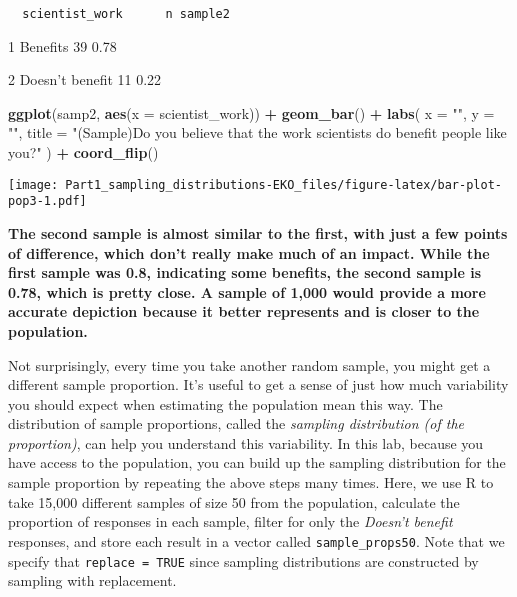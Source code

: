 \documentclass[
]{article}
\newenvironment{Shaded}{\begin{snugshade}}{\end{snugshade}}
\newcommand{\AttributeTok}[1]{\textcolor[rgb]{0.13,0.29,0.53}{#1}}
\newcommand{\FunctionTok}[1]{\textcolor[rgb]{0.13,0.29,0.53}{\textbf{#1}}}
\newcommand{\NormalTok}[1]{#1}
\newcommand{\SpecialCharTok}[1]{\textcolor[rgb]{0.81,0.36,0.00}{\textbf{#1}}}
\newcommand{\StringTok}[1]{\textcolor[rgb]{0.31,0.60,0.02}{#1}}
\begin{document}
\begin{verbatim}
  scientist_work      n sample2
\end{verbatim}

1 Benefits 39 0.78

2 Doesn't benefit 11 0.22

\begin{Shaded}
\begin{Highlighting}[]
\FunctionTok{ggplot}\NormalTok{(samp2, }\FunctionTok{aes}\NormalTok{(}\AttributeTok{x =}\NormalTok{ scientist\_work)) }\SpecialCharTok{+}
  \FunctionTok{geom\_bar}\NormalTok{() }\SpecialCharTok{+}
  \FunctionTok{labs}\NormalTok{(}
    \AttributeTok{x =} \StringTok{""}\NormalTok{, }\AttributeTok{y =} \StringTok{""}\NormalTok{,}
    \AttributeTok{title =} \StringTok{"(Sample)Do you believe that the work scientists do benefit people like you?"}
\NormalTok{  ) }\SpecialCharTok{+}
  \FunctionTok{coord\_flip}\NormalTok{() }
\end{Highlighting}
\end{Shaded}

\texttt{[image: Part1\_sampling\_distributions-EKO\_files/figure-latex/bar-plot-pop3-1.pdf]}

\textbf{The second sample is almost similar to the first, with just a
few points of difference, which don't really make much of an impact.
While the first sample was 0.8, indicating some benefits, the second
sample is 0.78, which is pretty close. A sample of 1,000 would provide a
more accurate depiction because it better represents and is closer to
the population.}

Not surprisingly, every time you take another random sample, you might
get a different sample proportion. It's useful to get a sense of just
how much variability you should expect when estimating the population
mean this way. The distribution of sample proportions, called the
\emph{sampling distribution (of the proportion)}, can help you
understand this variability. In this lab, because you have access to the
population, you can build up the sampling distribution for the sample
proportion by repeating the above steps many times. Here, we use R to
take 15,000 different samples of size 50 from the population, calculate
the proportion of responses in each sample, filter for only the
\emph{Doesn't benefit} responses, and store each result in a vector
called \texttt{sample\_props50}. Note that we specify that
\texttt{replace\ =\ TRUE} since sampling distributions are constructed
by sampling with replacement.
\end{document}
